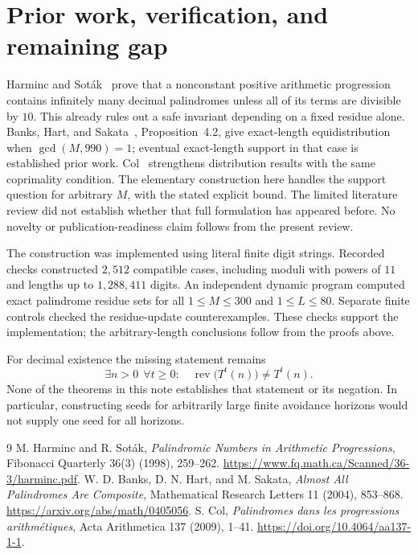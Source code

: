 \documentclass[11pt]{article}
\newcommand{\rev}{\operatorname{rev}}
\begin{document}
\section{Prior work, verification, and remaining gap}
Harminc and Sot\'{a}k~\cite{HS} prove that a nonconstant positive arithmetic
progression contains infinitely many decimal palindromes unless all of
its terms are divisible by $10$. This already rules out a safe invariant
depending on a fixed residue alone. Banks, Hart, and Sakata~\cite{BHS},
Proposition~4.2, give exact-length equidistribution when
$\gcd(M,990)=1$; eventual exact-length support in that case is established
prior work. Col~\cite{Col} strengthens distribution results with the same
coprimality condition. The elementary construction here handles the
support question for arbitrary $M$, with the stated explicit bound.
The limited literature review did not establish whether that full
formulation has appeared before. No novelty or publication-readiness
claim follows from the present review.

The construction was implemented using literal finite digit strings.
Recorded checks constructed $2,512$ compatible cases, including moduli
with powers of $11$ and lengths up to $1,288,411$ digits. An independent
dynamic program computed exact palindrome residue sets for all
$1\leq M\leq300$ and $1\leq L\leq80$. Separate finite controls checked
the residue-update counterexamples. These checks support the implementation;
the arbitrary-length conclusions follow from the proofs above.



For decimal existence the missing statement remains
\[
 \exists n>0\ \ \forall t\geq0:\quad
 \rev\bigl(T^t(n)\bigr)\neq T^t(n).
\]
None of the theorems in this note establishes that statement or its
negation. In particular, constructing seeds for arbitrarily large finite
avoidance horizons would not supply one seed for all horizons.

\begin{thebibliography}{9}
 M. Harminc and R. Sot\'{a}k,
\emph{Palindromic Numbers in Arithmetic Progressions},
Fibonacci Quarterly 36(3) (1998), 259--262.
\url{https://www.fq.math.ca/Scanned/36-3/harminc.pdf}.
 W. D. Banks, D. N. Hart, and M. Sakata,
\emph{Almost All Palindromes Are Composite},
Mathematical Research Letters 11 (2004), 853--868.
\url{https://arxiv.org/abs/math/0405056}.
 S. Col,
\emph{Palindromes dans les progressions arithm\'{e}tiques},
Acta Arithmetica 137 (2009), 1--41.
\url{https://doi.org/10.4064/aa137-1-1}.
\end{thebibliography}
\end{document}
